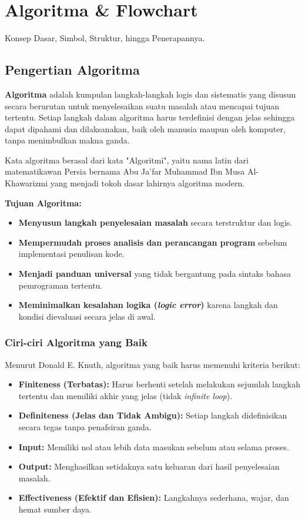\section{Algoritma \& Flowchart}
Konsep Dasar, Simbol, Struktur, hingga Penerapannya.

\subsection{Pengertian Algoritma}
\textbf{Algoritma} adalah kumpulan langkah-langkah logis dan sistematis yang disusun secara berurutan untuk menyelesaikan suatu masalah atau mencapai tujuan tertentu. Setiap langkah dalam algoritma harus terdefinisi dengan jelas sehingga dapat dipahami dan dilaksanakan, baik oleh manusia maupun oleh komputer, tanpa menimbulkan makna ganda. 

Kata algoritma berasal dari kata "Algoritmi", yaitu nama latin dari matematikawan Persia bernama Abu Ja'far Muhammad Ibn Musa Al-Khawarizmi yang menjadi tokoh dasar lahirnya algoritma modern.

\textbf{Tujuan Algoritma:}
\begin{itemize}
    \item \textbf{Menyusun langkah penyelesaian masalah} secara terstruktur dan logis.
    \item \textbf{Mempermudah proses analisis dan perancangan program} sebelum implementasi penulisan kode.
    \item \textbf{Menjadi panduan universal} yang tidak bergantung pada sintaks bahasa pemrograman tertentu.
    \item \textbf{Meminimalkan kesalahan logika (\textit{logic error})} karena langkah dan kondisi dievaluasi secara jelas di awal.
\end{itemize}

\subsubsection{Ciri-ciri Algoritma yang Baik}
Menurut Donald E. Knuth, algoritma yang baik harus memenuhi kriteria berikut:
\begin{itemize}
    \item \textbf{Finiteness (Terbatas):} Harus berhenti setelah melakukan sejumlah langkah tertentu dan memiliki akhir yang jelas (tidak \textit{infinite loop}).
    \item \textbf{Definiteness (Jelas dan Tidak Ambigu):} Setiap langkah didefinisikan secara tegas tanpa penafsiran ganda.
    \item \textbf{Input:} Memiliki nol atau lebih data masukan sebelum atau selama proses.
    \item \textbf{Output:} Menghasilkan setidaknya satu keluaran dari hasil penyelesaian masalah.
    \item \textbf{Effectiveness (Efektif dan Efisien):} Langkahnya sederhana, wajar, dan hemat sumber daya.
\end{itemize}


